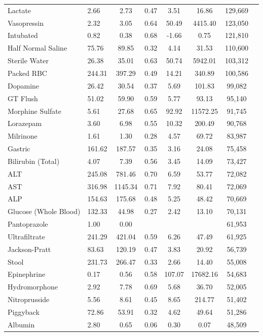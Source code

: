 \begin{longtable}{p{3.5cm}lcccccc}
Lactate & 2.66 & 2.73 & 0.47 & 3.51 & 16.86 & 129,669 \\
Vasopressin & 2.32 & 3.05 & 0.64 & 50.49 & 4415.40 & 123,050 \\
Intubated & 0.82 & 0.38 & 0.68 & -1.66 & 0.75 & 121,810 \\
Half Normal Saline & 75.76 & 89.85 & 0.32 & 4.14 & 31.53 & 110,600 \\
Sterile Water & 26.38 & 35.01 & 0.63 & 50.74 & 5942.01 & 103,312 \\
Packed RBC & 244.31 & 397.29 & 0.49 & 14.21 & 340.89 & 100,586 \\
Dopamine & 26.42 & 30.54 & 0.37 & 5.69 & 101.83 & 99,082 \\
GT Flush & 51.02 & 59.90 & 0.59 & 5.77 & 93.13 & 95,140 \\
Morphine Sulfate & 5.61 & 27.68 & 0.65 & 92.92 & 11572.25 & 91,745 \\
Lorazepam & 3.60 & 6.98 & 0.55 & 10.32 & 200.49 & 90,768 \\
Milrinone & 1.61 & 1.30 & 0.28 & 4.57 & 69.72 & 83,987 \\
Gastric & 161.62 & 187.57 & 0.35 & 3.16 & 24.08 & 75,458 \\
Bilirubin (Total) & 4.07 & 7.39 & 0.56 & 3.45 & 14.09 & 73,427 \\
ALT & 245.08 & 781.46 & 0.70 & 6.59 & 53.77 & 72,082 \\
AST & 316.98 & 1145.34 & 0.71 & 7.92 & 80.41 & 72,069 \\
ALP & 154.63 & 175.68 & 0.48 & 5.25 & 48.42 & 70,669 \\
Glucose (Whole Blood) & 132.33 & 44.98 & 0.27 & 2.42 & 13.10 & 70,131 \\
Pantoprazole & 1.00 & 0.00 &  &  &  & 61,953 \\
Ultrafiltrate & 241.29 & 421.04 & 0.59 & 6.26 & 47.49 & 61,925 \\
Jackson-Pratt & 83.63 & 120.19 & 0.47 & 3.83 & 20.92 & 56,739 \\
Stool & 231.73 & 266.47 & 0.33 & 2.66 & 14.40 & 55,008 \\
Epinephrine & 0.17 & 0.56 & 0.58 & 107.07 & 17682.16 & 54,683 \\
Hydromorphone & 2.92 & 7.78 & 0.69 & 5.68 & 36.70 & 52,005 \\
Nitroprusside & 5.56 & 8.61 & 0.45 & 8.65 & 214.77 & 51,402 \\
Piggyback & 72.86 & 53.91 & 0.32 & 4.62 & 49.64 & 51,286 \\
Albumin & 2.80 & 0.65 & 0.06 & 0.30 & 0.07 & 48,509 \\

\end{longtable}
